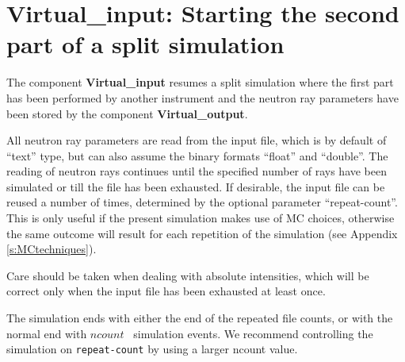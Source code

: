\section{Virtual\_input: Starting the second part of a split simulation}
\label{virtual_input}


The component \textbf{Virtual\_input} resumes a split simulation where the
first part has been performed by another instrument and the neutron ray
parameters have been stored by the component \textbf{Virtual\_output}.

All neutron ray parameters are read from the input file, which is by default
of ``text'' type, but can also assume the binary formats
``float'' and ``double''. The reading of neutron rays continues until the
specified number of rays have been simulated or
till the file has been exhausted. If desirable, the input file
can be reused a number of times, determined by the optional parameter
``repeat-count''. This is only useful if the present simulation makes use of
MC choices, otherwise the same outcome will result for each repetition of the
simulation (see Appendix \ref{s:MCtechniques}).

Care should be taken when dealing with
absolute intensities, which will be correct only
when the input file has been exhausted at least once.

The simulation ends with either the end of the repeated file counts,
or with the normal end with $ncount$ \MCX\ simulation events. We recommend
controlling the simulation on \verb+repeat-count+ by using
a larger ncount value.
